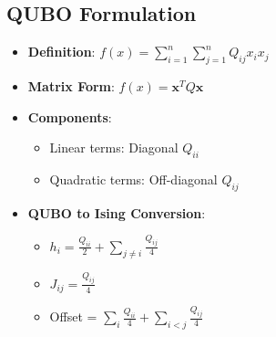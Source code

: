 \begin{multicols}{3}
                  \section*{QUBO Formulation}
                  \begin{itemize}[leftmargin=*,nosep,topsep=0pt]
                    \item \textbf{Definition}: $f(x) = \sum_{i=1}^n\sum_{j=1}^n Q_{ij}x_i x_j$
                    \item \textbf{Matrix Form}: $f(x) = \mathbf{x}^T Q \mathbf{x}$
                    \item \textbf{Components}:
                      \begin{itemize}[nosep]
                        \item Linear terms: Diagonal $Q_{ii}$
                        \item Quadratic terms: Off-diagonal $Q_{ij}$
                      \end{itemize}
                    \item \textbf{QUBO to Ising Conversion}:
                      \begin{itemize}[nosep]
                        \item $h_i = \frac{Q_{ii}}{2} + \sum_{j \neq i}\frac{Q_{ij}}{4}$
                        \item $J_{ij} = \frac{Q_{ij}}{4}$
                        \item Offset = $\sum_i\frac{Q_{ii}}{4} + \sum_{i<j}\frac{Q_{ij}}{4}$
                      \end{itemize}
                  \end{itemize}
                \end{multicols}
                \endgroup
